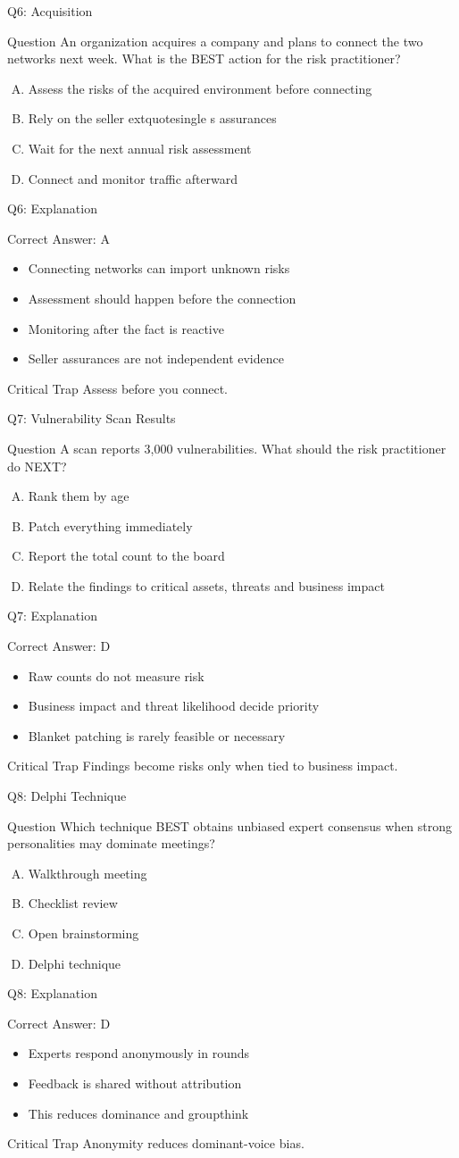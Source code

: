 \documentclass[aspectratio=169]{beamer}
\newcommand{\hq}[7]{%
	\begin{frame}{Q#1: #2}
		\begin{block}{Question}
			#3
		\end{block}
		\begin{enumerate}[(A)]
			#4
		\end{enumerate}
	\end{frame}
	\begin{frame}{Q#1: Explanation}
		\begin{block}{Correct Answer: #5}
			\begin{itemize}
				#6
			\end{itemize}
		\end{block}
		\begin{alertblock}{Critical Trap}
			#7
		\end{alertblock}
	\end{frame}
}
\begin{document}
	\hq{6}{Acquisition}
	{An organization acquires a company and plans to connect the two networks next week. What is the BEST action for the risk practitioner?}
	{\item Assess the risks of the acquired environment before connecting
		\item Rely on the seller	extquotesingle s assurances
		\item Wait for the next annual risk assessment
		\item Connect and monitor traffic afterward}
	{A}
	{\item Connecting networks can import unknown risks
		\item Assessment should happen before the connection
		\item Monitoring after the fact is reactive
		\item Seller assurances are not independent evidence}
	{Assess before you connect.}
	
	\hq{7}{Vulnerability Scan Results}
	{A scan reports 3,000 vulnerabilities. What should the risk practitioner do NEXT?}
	{\item Rank them by age
		\item Patch everything immediately
		\item Report the total count to the board
		\item Relate the findings to critical assets, threats and business impact}
	{D}
	{\item Raw counts do not measure risk
		\item Business impact and threat likelihood decide priority
		\item Blanket patching is rarely feasible or necessary}
	{Findings become risks only when tied to business impact.}
	
	\hq{8}{Delphi Technique}
	{Which technique BEST obtains unbiased expert consensus when strong personalities may dominate meetings?}
	{\item Walkthrough meeting
		\item Checklist review
		\item Open brainstorming
		\item Delphi technique}
	{D}
	{\item Experts respond anonymously in rounds
		\item Feedback is shared without attribution
		\item This reduces dominance and groupthink}
	{Anonymity reduces dominant-voice bias.}
	
\end{document}
